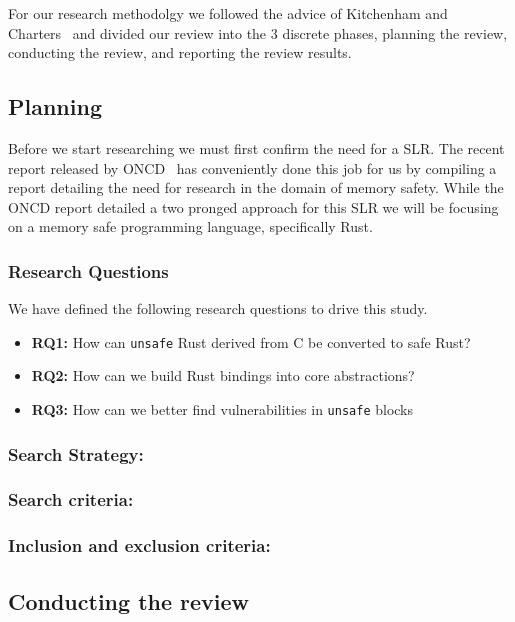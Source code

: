 \documentclass[sigconf]{acmart}
\begin{document}
For our research methodolgy we followed the advice of Kitchenham and Charters~\cite{Stuart2007-cc}
and divided our review into the 3 discrete phases, planning the review, conducting the review, and
reporting the review results.

\subsection{Planning}

Before we start researching we must first confirm the need for a SLR. The recent report released by
ONCD~\cite{United_States_Gov2024-pp} has conveniently done this job for us by compiling a report
detailing the need for research in the domain of memory safety. While the ONCD report detailed a two
pronged approach for this SLR we will be focusing on a memory safe programming language,
specifically Rust.

\subsubsection{Research Questions}
We have defined the following research questions to drive this study.

\begin{itemize}
    \item \textbf{RQ1:} How can \lstinline{unsafe} Rust derived from C be converted to safe Rust?
    \item \textbf{RQ2:} How can we build Rust bindings into core abstractions?
    \item \textbf{RQ3:} How can we better find vulnerabilities in \lstinline{unsafe} blocks
\end{itemize}

\subsubsection{Search Strategy:}

\subsubsection{Search criteria:}

\subsubsection{Inclusion and exclusion criteria:}

\subsection{Conducting the review}
\end{document}
